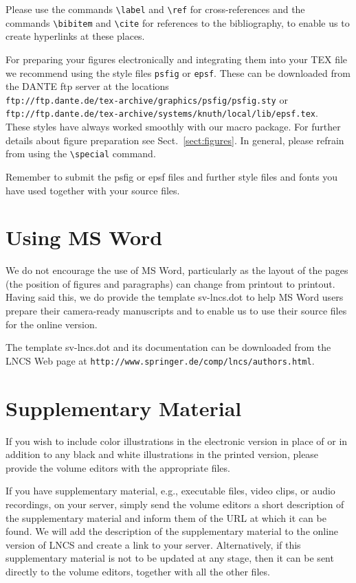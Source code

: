 \documentclass[runningheads]{llncs}
\begin{document}
Please use the commands \verb+\label+ and \verb+\ref+ for
cross-references and the commands \verb+\bibitem+ and \verb+\cite+ for
references to the bibliography, to enable us to create hyperlinks at
these places.

For preparing your figures electronically and integrating them into
your TEX file we recommend using the style files \verb+psfig+ or
\verb+epsf+. These can be downloaded from the DANTE ftp server at the
locations\\
\indent \verb+ftp://ftp.dante.de/tex-archive/graphics/psfig/psfig.sty+
or\\ \indent
\verb+ftp://ftp.dante.de/tex-archive/systems/knuth/local/lib/epsf.tex+.\\
These styles have always worked smoothly with our macro package. For
further details about figure preparation see Sect.~\ref{sect:figures}.
In general, please refrain from using the \verb+\special+ command.

Remember to submit the psfig or epsf files and further style files and
fonts you have used together with your source files.


\section{Using MS Word}
\label{sect:Word}

We do not encourage the use of MS Word, particularly as the layout of
the pages (the position of figures and paragraphs) can change from
printout to printout. Having said this, we do provide the template
sv-lncs.dot to help MS Word users
prepare their camera-ready manuscripts and to
enable us to use their source files for the online version.

The template sv-lncs.dot and its documentation can be downloaded from
the LNCS Web page at
\verb+http://www.springer.de/comp/lncs/authors.html+.

\section{Supplementary Material}

If you wish to include color illustrations in the electronic
version in place of or in addition to any black and white illustrations
in the printed version, please provide the volume editors with the
appropriate files.

If you have supplementary material, e.g., executable files, video clips,
or audio recordings, on your server, simply send the volume editors a
short description of the supplementary material and inform them of the
URL at which it can be found.
We will add the description of the supplementary material to the online
version of LNCS and create a link to your server. Alternatively, if this
supplementary material is not to be updated at any stage, then it can be
sent directly to the volume editors, together with all the other files.
\end{document}
